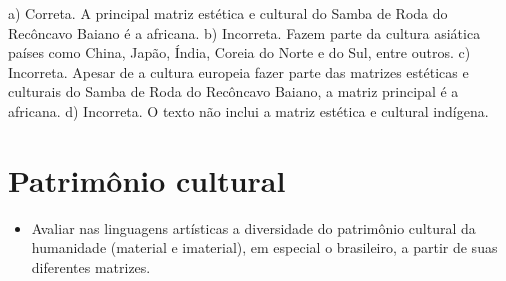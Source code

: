 \begin{escolha}
{a) Correta. A principal matriz estética e cultural do Samba de Roda do
Recôncavo Baiano é a africana.
b) Incorreta. Fazem parte da cultura asiática países como China,
Japão, Índia, Coreia do Norte e do Sul, entre outros.
c) Incorreta. Apesar de a cultura europeia fazer parte das matrizes
estéticas e culturais do Samba de Roda do Recôncavo Baiano, a matriz
principal é a africana.
d) Incorreta. O texto não inclui a matriz estética e cultural indígena.}

\chapter{Patrimônio cultural}



\begin{itemize}
\item Avaliar nas linguagens artísticas a diversidade do patrimônio cultural
da humanidade (material e imaterial), em especial o brasileiro, a partir
de suas diferentes matrizes.
\end{itemize}

\end{escolha}

